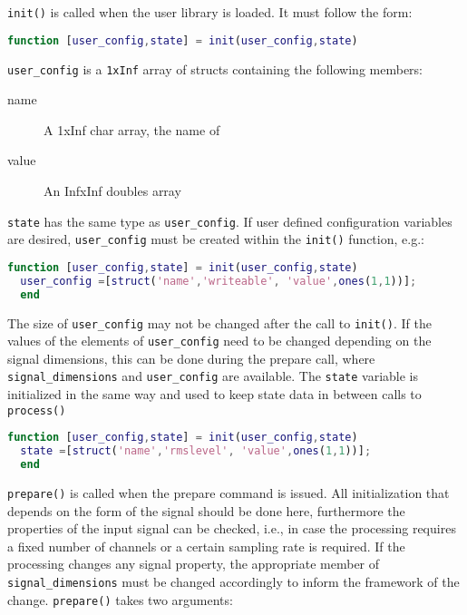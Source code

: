 \documentclass[11pt,a4paper,twoside]{article}
\newcommand{\+}{\discretionary{\mbox{\scriptsize$\hookleftarrow$}}{}{}}
\begin{document}
\texttt{init()} is called when the user library is loaded. It must follow the form:
\begin{lstlisting}[language=Matlab]
  function [user_config,state] = init(user_config,state)
\end{lstlisting}
\texttt{user\_config} is a \texttt{1xInf} array of structs containing the following members:
\begin{description}
\item[name] A 1xInf char array, the name of 
\item[value] An InfxInf doubles array
\end{description}
\texttt{state} has the same type as \texttt{user\_config}.
If user defined configuration variables are desired, \texttt{user\_config} must
be created within the \texttt{init()} function, e.g.:
\begin{lstlisting}[language=Matlab]
  function [user_config,state] = init(user_config,state)
  user_config =[struct('name','writeable', 'value',ones(1,1))];
  end
\end{lstlisting}
The size of \texttt{user\_config} may not be changed after the call to \texttt{init()}. If the values of the
elements of \texttt{user\_config} need to be changed depending on the signal dimensions,
this can be done during the prepare call, where \texttt{signal\_dimensions} and
\texttt{user\_config} are available.
The \texttt{state} variable is initialized in the same way and used to keep
state data in between calls to \texttt{process()}
\begin{lstlisting}[language=Matlab]
  function [user_config,state] = init(user_config,state)
  state =[struct('name','rmslevel', 'value',ones(1,1))];
  end
\end{lstlisting}
\texttt{prepare()} is called when the prepare command is issued. All
initialization that depends on the form of the signal should be done here,
furthermore the properties of the input signal can be checked, i.e., in case the 
processing requires a fixed number of channels or a certain sampling rate is
required. If the processing changes any signal property, the
appropriate member of \texttt{signal\_dimensions} must be changed accordingly to
inform the \mha{} framework of the change.
\texttt{prepare()} takes two arguments:
\end{document}
